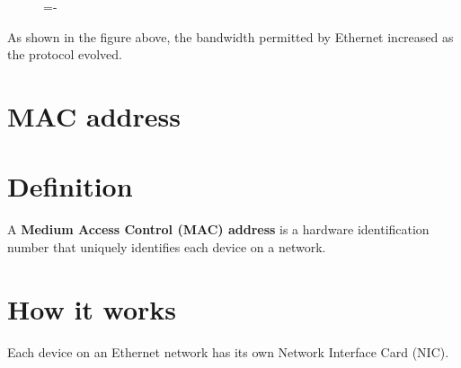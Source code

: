 \documentclass[a4paper]{systems-software}
\begin{document}
\begin{figure}[H]
	\lineskip=-\fboxrule
\end{figure}

As shown in the figure above, the bandwidth permitted by Ethernet increased as the protocol evolved.


\section{MAC address}

\section*{Definition}

A \textbf{Medium Access Control (MAC) address} is a hardware identification number that uniquely identifies each device on a network.


\section*{How it works}

Each device on an Ethernet network has its own Network Interface Card (NIC).
\end{document}
